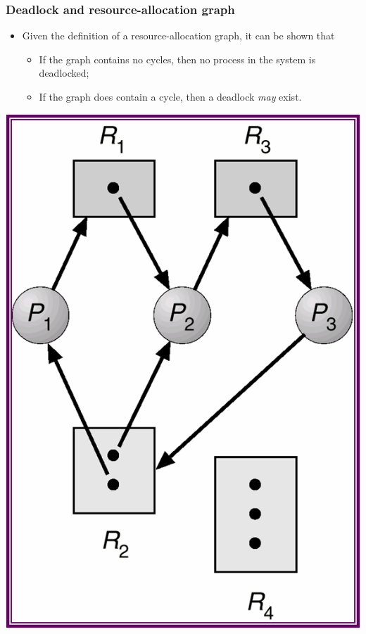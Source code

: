 \documentclass[CJKutf8,xcolor=pdftex,dvipsnames,table]{beamer}
\begin{document}
\begin{CJK*}{UTF8}{song}
  \begin{frame}
  \frametitle{Deadlock and resource-allocation graph} \pause
  \begin{itemize}
  \item{Given the definition of a resource-allocation graph, it can be shown that} \pause
    \begin{itemize}
    \item{If the graph contains no cycles, then no process in the system is deadlocked;} \pause
    \item{If the graph does contain a cycle, then a deadlock \emph{may} exist.} \pause
    \end{itemize}
  \end{itemize}
  \begin{minipage}[c]{0.5\textwidth}
    \centering
    \includegraphics[scale=.3]{v6f8-2} \pause

\end{minipage}
\end{frame}
\end{CJK*}
\end{document}

